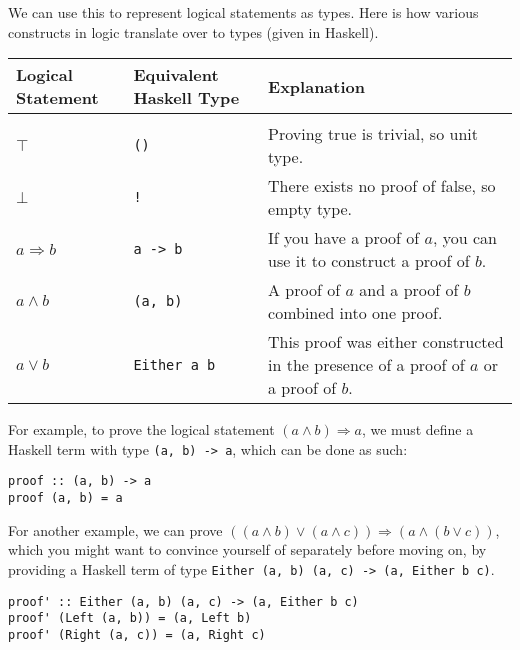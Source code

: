 \documentclass[12pt,twoside]{report}
\begin{document}
We can use this to represent logical statements as types. Here is how various constructs in logic translate over to types (given in Haskell).

\begin{tabularx}{\textwidth}{ X|X|X }
  Logical Statement & Equivalent Haskell Type & Explanation \\
  \hline \\
  $\top$ & \verb|()| & Proving true is trivial, so unit type. \\
  $\bot$ & \verb|!| & There exists no proof of false, so empty type. \\
  $a \Rightarrow b$ & \verb|a -> b| & If you have a proof of $a$, you can use it to construct a proof of $b$. \\
  $a \wedge b$ & \verb|(a, b)| & A proof of $a$ and a proof of $b$ combined into one proof. \\
  $a \vee b$ & \verb|Either a b| & This proof was either constructed in the presence of a proof of $a$ or a proof of $b$.
\end{tabularx}

For example, to prove the logical statement $(a \wedge b) \Rightarrow a$, we must define a Haskell term with type \verb|(a, b) -> a|, which can be done as such:

\begin{lstlisting}
proof :: (a, b) -> a
proof (a, b) = a
\end{lstlisting}

For another example, we can prove $((a \wedge b) \vee (a \wedge c)) \Rightarrow (a \wedge (b \vee c))$, which you might want to convince yourself of separately before moving on, by providing a Haskell term of type \verb|Either (a, b) (a, c) -> (a, Either b c)|.

\begin{lstlisting}
proof' :: Either (a, b) (a, c) -> (a, Either b c)
proof' (Left (a, b)) = (a, Left b)
proof' (Right (a, c)) = (a, Right c)
\end{lstlisting}
\end{document}
